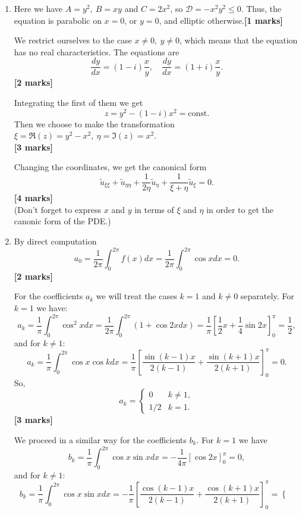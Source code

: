 \documentclass[11pt,a4paper]{article}
\newcommand{\mrk}[1]{\hfill\textbf{[#1 marks]}}
\begin{document}
\begin{enumerate}
\begin{enumerate}
		\end{enumerate}
		\item Here we have $A = y^2,\ B = xy$ and $C = 2x^2$, so $\mathcal{D} = -x^2y^2 \leq 0$. Thus, the equation is parabolic on $x = 0$, or $y = 0$, and elliptic otherwise.\mrk{1}\par
		We restrict ourselves to the case $x \neq 0,\ y \neq 0$, which means that the equation has no real characteristics. The equations are
		$$
		\frac{dy}{dx} = (1 - i)\frac{x}{y},\quad \frac{dy}{dx} = (1 + i)\frac{x}{y}.
		$$
		\mrk{2}\par
		Integrating the first of them we get
		$$
		z = y^2 - (1 - i)x^2 = \text{const}.
		$$
		Then we choose to make the transformation $\xi = \Re(z) = y^2 - x^2,\ \eta = \Im(z) = x^2$.\\
		\vspace*{0ex}\mrk{3}\par
		Changing the coordinates, we get the canonical form
		$$
		\tilde{u}_{\xi\xi} + \tilde{u}_{\eta\eta} + \frac{1}{2\eta}\tilde{u}_\eta + \frac{1}{\xi + \eta}\tilde{u}_\xi = 0.
		$$
		\mrk{4}\\
		(Don’t forget to express $x$ and $y$ in terms of $\xi$ and $\eta$ in order to get the canonic form of the PDE.)
		\item By direct computation
		$$
		a_0 = \frac{1}{2\pi}\int_0^{2\pi} f(x)dx = \frac{1}{2\pi}\int_0^{2\pi}\cos xdx = 0.
		$$
		\mrk{2}\par
		For the coefficients $a_k$ we will treat the cases $k = 1$ and $k \neq 0$ separately. For $k = 1$ we have:
		$$
		a_k = \frac{1}{\pi}\int_0^{2\pi}\cos^2xdx = \frac{1}{2\pi}\int_0^{2\pi}(1 + \cos 2xdx) = \frac{1}{\pi}\left[\frac{1}{2}x + \frac{1}{4}\sin 2x\right]_0^\pi = \frac{1}{2},
		$$
		and for $k \neq 1$:
		$$
		a_k = \frac{1}{\pi}\int_0^{2\pi}\cos x\cos kdx = \frac{1}{\pi}\left[\frac{\sin(k-1)x}{2(k-1)} + \frac{\sin(k+1)x}{2(k + 1)}\right]_0^\pi = 0.
		$$
		So,
		$$
		a_k = 
		\begin{cases}
			0 & k \neq 1,\\
			1/2 & k = 1.
		\end{cases}
		$$
		\mrk{3}\par
		We proceed in a similar way for the coefficients $b_k$. For $k = 1$ we have
		$$
		b_k = \frac{1}{\pi}\int_0^{2\pi}\cos x\sin xdx = -\frac{1}{4\pi}[\cos2x]_0^\pi = 0,
		$$
		and for $k \neq 1$:
		$$
		b_k = \frac{1}{\pi}\int_0^{2\pi}\cos x\sin xdx = -\frac{1}{\pi}\left[\frac{\cos(k-1)x}{2(k-1)} + \frac{\cos(k+1)x}{2(k + 1)}\right]_0^\pi =
		\begin{cases}

\end{cases}$$
\end{enumerate}
\end{document}
